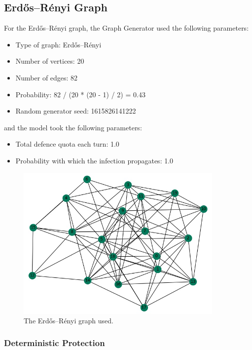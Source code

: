 \documentclass[results.tex]{subfiles}
\begin{document}
\newpage

\subsection{Erdős–Rényi Graph}

For the Erdős–Rényi graph, the Graph Generator used the following parameters:

\begin{itemize}
\item Type of graph: Erdős–Rényi
\item Number of vertices: 20
\item Number of edges: 82
\item Probability: 82 / (20 * (20 - 1) / 2) = 0.43
\item Random generator seed: 1615826141222
\end{itemize}
and the model took the following parameters:
\begin{itemize}
\item Total defence quota each turn: 1.0
\item Probability with which the infection propagates: 1.0
\end{itemize}

\begin{figure}[!ht]
	\centering
	\includegraphics[width=0.9\textwidth]{erdosRenyi.jpg}
	\caption{The Erdős–Rényi graph used.}
	\label{fig:erdren}
\end{figure}

\subsubsection{Deterministic Protection}
\end{document}
